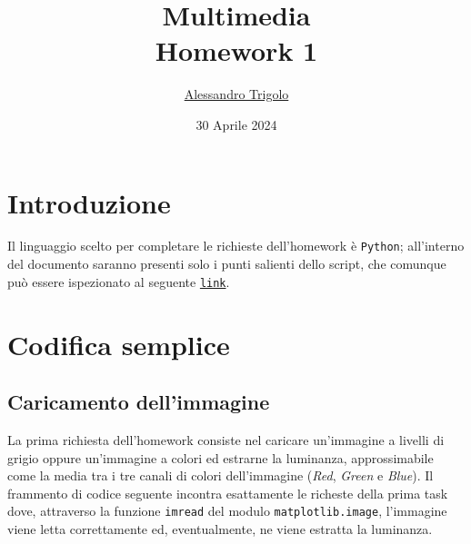 \title{\vspace{160px} \textbf{\huge{Multimedia}} \\\vspace{17.5px} \LARGE{Homework 1}  \vspace{10px}}
\author{\href{https://github.com/imAlessas}{Alessandro Trigolo}}
\date{30 Aprile 2024}



\maketitle\newpage

\tableofcontents
\listoffigures
\vspace{20px}
\newpage

\listoftodos\newpage


\section*{Introduzione}
Il linguaggio scelto per completare le richieste dell'homework è \texttt{Python}; all'interno del documento saranno presenti solo i punti salienti dello script, che comunque può essere ispezionato al seguente \href{https://github.com/imAlessas/computer-networks/blob/main/multimedia/hw-1/script/lossless_coding.py}{\texttt{link}}.


\section{Codifica semplice} 

\vspace{15px}\subsection{Caricamento dell'immagine}
La prima richiesta dell'homework consiste nel caricare un'immagine a livelli di grigio oppure un'immagine a colori ed estrarne la luminanza, approssimabile come la media tra i tre canali di colori dell'immagine (\textsl{Red}, \textsl{Green} e \textsl{Blue}). Il frammento di codice seguente incontra esattamente le richeste della prima task dove, attraverso la funzione \texttt{imread} del modulo \texttt{matplotlib.image}, l'immagine viene letta correttamente ed, eventualmente, ne viene estratta la luminanza.

